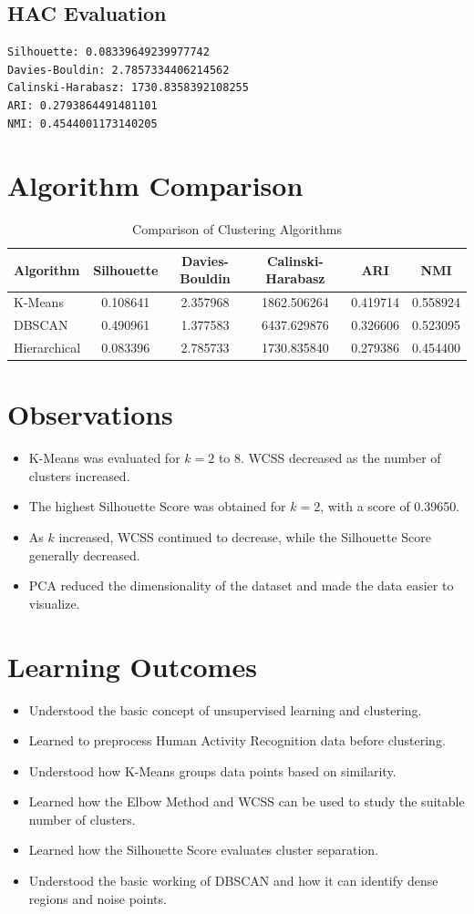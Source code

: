 \documentclass[12pt,a4paper]{article}
\begin{document}
\subsection{HAC Evaluation}
\begin{verbatim}
Silhouette: 0.08339649239977742
Davies-Bouldin: 2.7857334406214562
Calinski-Harabasz: 1730.8358392108255
ARI: 0.2793864491481101
NMI: 0.4544001173140205
\end{verbatim}

\section{Algorithm Comparison}
\begin{table}[H]
\centering
\begin{tabular}{lccccc}
\toprule
Algorithm & Silhouette & Davies-Bouldin & Calinski-Harabasz & ARI & NMI\\
\midrule
K-Means & 0.108641 & 2.357968 & 1862.506264 & 0.419714 & 0.558924\\
DBSCAN & 0.490961 & 1.377583 & 6437.629876 & 0.326606 & 0.523095\\
Hierarchical & 0.083396 & 2.785733 & 1730.835840 & 0.279386 & 0.454400\\
\bottomrule
\end{tabular}
\caption{Comparison of Clustering Algorithms}
\end{table}

\section{Observations}
\begin{itemize}
\item K-Means was evaluated for $k=2$ to $8$. WCSS decreased as the number of clusters increased.
\item The highest Silhouette Score was obtained for $k=2$, with a score of 0.39650.
\item As $k$ increased, WCSS continued to decrease, while the Silhouette Score generally decreased.
\item PCA reduced the dimensionality of the dataset and made the data easier to visualize.
\end{itemize}

\section{Learning Outcomes}
\begin{itemize}
\item Understood the basic concept of unsupervised learning and clustering.
\item Learned to preprocess Human Activity Recognition data before clustering.
\item Understood how K-Means groups data points based on similarity.
\item Learned how the Elbow Method and WCSS can be used to study the suitable number of clusters.
\item Learned how the Silhouette Score evaluates cluster separation.
\item Understood the basic working of DBSCAN and how it can identify dense regions and noise points.
\end{itemize}
\end{document}
